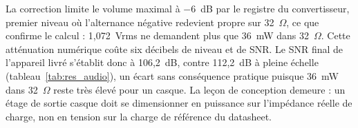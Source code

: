 La correction limite le volume maximal à $-6$~dB par le registre du convertisseur, premier niveau où l'alternance négative redevient propre sur 32~$\Omega$, ce que confirme le calcul : 1,072~Vrms ne demandent plus que 36~mW dans 32~$\Omega$. Cette atténuation numérique coûte six décibels de niveau et de SNR. Le SNR final de l'appareil livré s'établit donc à 106,2~dB, contre 112,2~dB à pleine échelle (tableau~\ref{tab:res_audio}), un écart sans conséquence pratique puisque 36~mW dans 32~$\Omega$ reste très élevé pour un casque. La leçon de conception demeure : un étage de sortie casque doit se dimensionner en puissance sur l'impédance réelle de charge, non en tension sur la charge de référence du datasheet.
